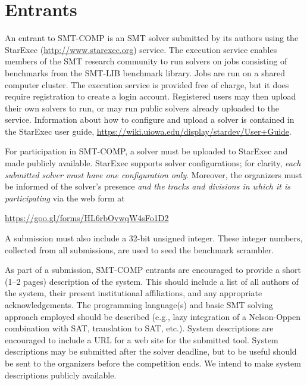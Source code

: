 \documentclass[12pt]{article}
\begin{document}

\section{Entrants}
\label{sec:entrants}

%
An entrant to SMT-COMP is an SMT solver submitted by its authors using
the StarExec (\url{http://www.starexec.org}) service.  The execution
service enables members of the SMT research community to run solvers
on jobs consisting of benchmarks from the SMT-LIB benchmark library.
Jobs are run on a shared computer cluster.  The execution service is
provided free of charge, but it does require registration to create a
login account.  Registered users may then upload their own solvers to
run, or may run public solvers already uploaded to the service.
Information about how to configure and upload a solver is contained in
the StarExec user guide,
\url{https://wiki.uiowa.edu/display/stardev/User+Guide}.

For participation in SMT-COMP, a solver must be uploaded to StarExec
and made publicly available.  StarExec supports solver configurations;
for clarity, \emph{each submitted solver must have one configuration
  only}.  Moreover, the organizers must be informed of the solver's
presence \emph{and the tracks and divisions in which it is
  participating} via the web form at
\begin{center}
  \url{https://goo.gl/forms/HL6rbOywqW4sFo1D2}
\end{center}
A submission must also include a 32-bit unsigned integer.  These
integer numbers, collected from all submissions, are used to seed the
benchmark scrambler.

%
As part of a submission, SMT-COMP entrants are encouraged to provide a
short (1--2 pages) description of the system.  This should include a
list of all authors of the system, their present institutional
affiliations, and any appropriate acknowledgements.  The programming
language(s) and basic SMT solving approach employed should be
described (e.g., lazy integration of a Nelson-Oppen combination with
SAT, translation to SAT, etc.).  System descriptions are encouraged to
include a URL for a web site for the submitted tool.  System
descriptions may be submitted after the solver deadline, but to be
useful should be sent to the organizers before the competition ends.
We intend to make system descriptions publicly available.
\end{document}
